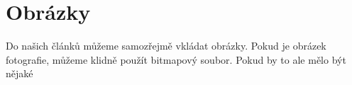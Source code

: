 \documentclass[11pt, a4paper]{article}
\begin{document}
\section{Obrázky}
Do našich článků můžeme samozřejmě vkládat obrázky. Pokud je obrázek fotografie, můžeme klidně použít bitmapový soubor. Pokud by to ale mělo být nějaké 
\end{document}
